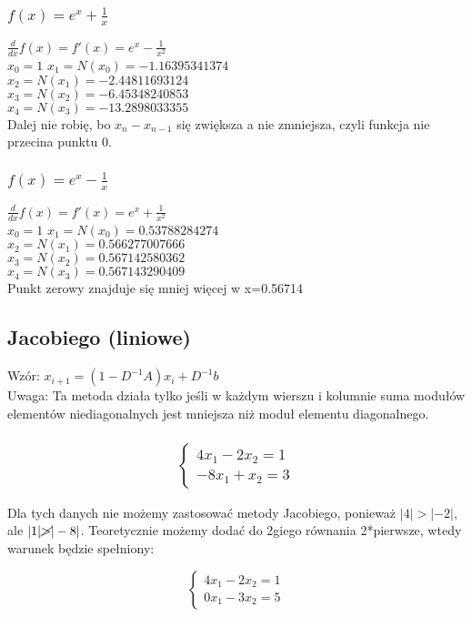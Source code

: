 \documentclass{article}
\begin{document}
\subsubsection{$f(x)=e^x+\frac{1}{x}$}
$\frac{d}{dx}f(x)=f'(x)=e^x-\frac{1}{x^2}$\\
$x_0=1$
$x_1=N(x_0)=-1.16395341374$\\
$x_2=N(x_1)=-2.44811693124$\\
$x_3=N(x_2)=-6.45348240853$\\
$x_4=N(x_3)=-13.2898033355$\\

Dalej nie robię, bo $x_n-x_{n-1}$ się zwiększa a nie zmniejsza, czyli funkcja nie przecina punktu 0.

\subsubsection{$f(x)=e^x-\frac{1}{x}$}
$\frac{d}{dx}f(x)=f'(x)=e^x+\frac{1}{x^2}$\\
$x_0=1$
$x_1=N(x_0)=0.53788284274$\\
$x_2=N(x_1)=0.566277007666$\\
$x_3=N(x_2)=0.567142580362$\\
$x_4=N(x_3)=0.567143290409$\\

Punkt zerowy znajduje się mniej więcej w x=0.56714

\subsection{Jacobiego (liniowe)}
Wzór: $x_{i+1}=(1-D^{-1}A)x_i+D^{-1}b$\\
Uwaga: Ta metoda działa tylko jeśli w każdym wierszu i kolumnie suma modułów elementów niediagonalnych jest mniejsza niż moduł elementu diagonalnego.
\subsubsection{\begin{equation*}\begin{cases}
    4x_1-2x_2=1\\
    -8x_1+x_2=3
\end{cases}\end{equation*}}
Dla tych danych nie możemy zastosować metody Jacobiego, ponieważ $|4|>|-2|$, ale $|1|\cancel{>}|-8|$. Teoretycznie możemy dodać do 2giego równania 2*pierwsze, wtedy warunek będzie spełniony:

\begin{equation*}\begin{cases}
    4x_1-2x_2=1\\
    0x_1-3x_2=5
\end{cases}\end{equation*}
\end{document}
